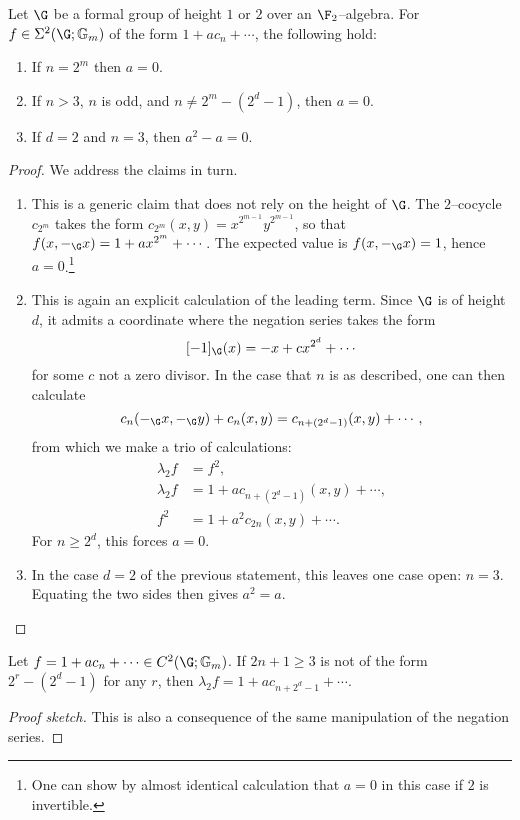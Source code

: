 \begin{lemma}\label{SigmaNonexistenceLemma}
Let \(\G\) be a formal group of height \(1\) or \(2\) over an \(\F_2\)--algebra.  For \(f \in \Sigma^2(\G; \Gm)\) of the form \(1 + a c_n + \cdots\), the following hold:
\begin{enumerate}
    \item If \(n = 2^m\) then \(a = 0\).
    \item If \(n > 3\), \(n\) is odd, and \(n \ne 2^m - (2^d - 1)\), then \(a = 0\).
    \item If \(d = 2\) and \(n = 3\), then \(a^2 - a = 0\).
\end{enumerate}
\end{lemma}
\begin{proof}
We address the claims in turn.
\begin{enumerate}
    \item This is a generic claim that does not rely on the height of \(\G\).  The \(2\)--cocycle \(c_{2^m}\) takes the form \(c_{2^m}(x, y) = x^{2^{m-1}} y^{2^{m-1}}\), so that \(f(x, -_{\G} x) = 1 + a x^{2^m} + \cdots\).  The expected value is \(f(x, -_{\G} x) = 1\), hence \(a = 0\).\footnote{One can show by almost identical calculation that \(a = 0\) in this case if \(2\) is invertible.}
    \item This is again an explicit calculation of the leading term.  Since \(\G\) is of height \(d\), it admits a coordinate where the negation series takes the form \[[-1]_{\G}(x) = -x + cx^{2^d} + \cdots\] for some \(c\) not a zero divisor.  In the case that \(n\) is as described, one can then calculate \[c_n(-_{\G} x, -_{\G} y) + c_n(x, y) = c_{n + (2^d-1)}(x, y) + \cdots,\] from which we make a trio of calculations:
    \begin{align*}
    \lambda_2 f & = f^2, \tag{uses \(f \in \Sigma^2(\G; \Gm)\)} \\
    \lambda_2 f & = 1 + ac_{n + (2^d-1)}(x, y) + \cdots, \tag{above observation} \\
    f^2 & = 1 + a^2 c_{2n}(x, y) + \cdots. \tag{characteristic \(2\)}
    \end{align*}
    For \(n \ge 2^d\), this forces \(a = 0\).
    \item In the case \(d = 2\) of the previous statement, this leaves one case open: \(n = 3\).  Equating the two sides then gives \(a^2 = a\).
    \qedhere
\end{enumerate}
\end{proof}

\begin{lemma}\label{SigmaArrowLemma}
Let \(f = 1 + a c_n + \cdots \in C^2(\G; \Gm)\).  If \(2n+1 \ge 3\) is not of the form \(2^r - (2^d - 1)\) for any \(r\), then \(\lambda_2 f = 1 + a c_{n + 2^d - 1} + \cdots\).
\end{lemma}
\begin{proof}[Proof sketch]
This is also a consequence of the same manipulation of the negation series.
\end{proof}

